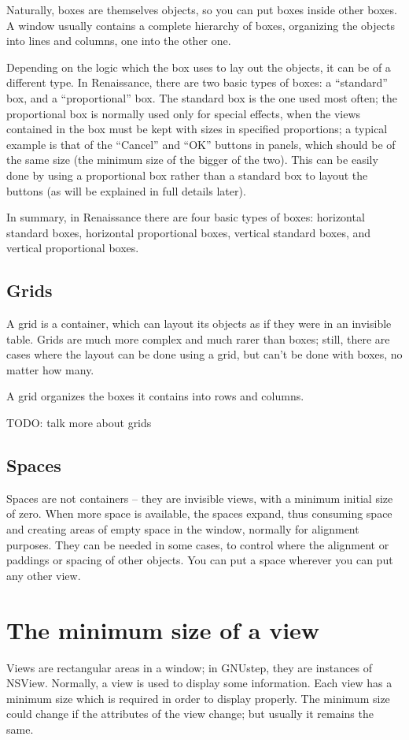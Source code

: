 Naturally, boxes are themselves objects, so you can put boxes inside
other boxes.  A window usually contains a complete hierarchy of boxes,
organizing the objects into lines and columns, one into the other one.

Depending on the logic which the box uses to lay out the objects, it
can be of a different type.  In Renaissance, there are two basic types of
boxes: a ``standard'' box, and a ``proportional'' box.  The standard
box is the one used most often; the proportional box is normally used
only for special effects, when the views contained in the box must be
kept with sizes in specified proportions; a typical example is that of
the ``Cancel'' and ``OK'' buttons in panels, which should be of the
same size (the minimum size of the bigger of the two).  This can be
easily done by using a proportional box rather than a standard box to
layout the buttons (as will be explained in full details later).

In summary, in Renaissance there are four basic types of boxes:
horizontal standard boxes, horizontal proportional boxes, vertical
standard boxes, and vertical proportional boxes.

\subsection{Grids}
A grid is a container, which can layout its objects as if they were in
an invisible table.  Grids are much more complex and much rarer than
boxes; still, there are cases where the layout can be done using a
grid, but can't be done with boxes, no matter how many.

A grid organizes the boxes it contains into rows and columns.

TODO: talk more about grids

\subsection{Spaces}
Spaces are not containers -- they are invisible views, with a minimum
initial size of zero.  When more space is available, the spaces
expand, thus consuming space and creating areas of empty space in the
window, normally for alignment purposes.  They can be needed in some
cases, to control where the alignment or paddings or spacing of other
objects.  You can put a space wherever you can put any other view.

\section{The minimum size of a view}
Views are rectangular areas in a window; in GNUstep, they are
instances of NSView.  Normally, a view is used to display some
information.  Each view has a minimum size which is required in order
to display properly.  The minimum size could change if the attributes
of the view change; but usually it remains the same.

